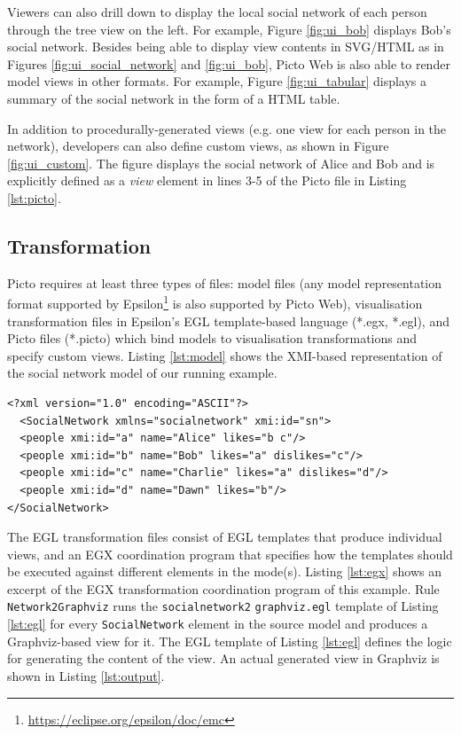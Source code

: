 \documentclass[sigconf,review]{acmart}
\begin{document}
Viewers can also drill down to display the local social network of each person through the tree view on the left. For example, Figure \ref{fig:ui_bob} displays Bob's social network. Besides being able to display view contents in SVG/HTML as in Figures \ref{fig:ui_social_network} and \ref{fig:ui_bob}, Picto Web is also able to render model views in other formats. For example, Figure \ref{fig:ui_tabular} displays a summary of the social network in the form of a HTML table. 

In addition to procedurally-generated views (e.g. one view for each person in the network), developers can also define custom views, as shown in Figure \ref{fig:ui_custom}. The figure displays the social network of Alice and Bob and is explicitly defined as a \emph{view} element in lines 3-5 of the Picto file in Listing \ref{lst:picto}.

\subsection{Transformation}
\label{sec:transformation}

Picto requires at least three types of files: model files (any model representation format supported by Epsilon\footnote{\url{https://eclipse.org/epsilon/doc/emc}} is also supported by Picto Web), visualisation transformation files in Epsilon's EGL template-based language (*.egx, *.egl), and Picto files (*.picto) which bind models to visualisation transformations and specify custom views. Listing \ref{lst:model} shows the XMI-based representation of the social network model of our running example. 

\begin{lstlisting}[firstnumber=1,style=model,caption={An a social network model as the input file for the lazy transformation. The format of the ids is simplified.},label=lst:model]
<?xml version="1.0" encoding="ASCII"?>
  <SocialNetwork xmlns="socialnetwork" xmi:id="sn">
  <people xmi:id="a" name="Alice" likes="b c"/>
  <people xmi:id="b" name="Bob" likes="a" dislikes="c"/>
  <people xmi:id="c" name="Charlie" likes="a" dislikes="d"/>
  <people xmi:id="d" name="Dawn" likes="b"/>
</SocialNetwork>
\end{lstlisting}

The EGL transformation files consist of EGL templates that produce individual views, and an EGX coordination program that specifies how the templates should be executed against different elements in the mode(s). Listing \ref{lst:egx} shows an excerpt of the EGX transformation coordination program of this example. Rule \texttt{Network2Graphviz} runs the \texttt{socialnetwork2} \texttt{graphviz.egl} template of Listing \ref{lst:egl} for every \texttt{SocialNetwork} element in the source model and produces a Graphviz-based view for it. The EGL template of Listing \ref{lst:egl} defines the logic for generating the content of the view. An actual generated view in Graphviz is shown in Listing \ref{lst:output}. 
\end{document}

